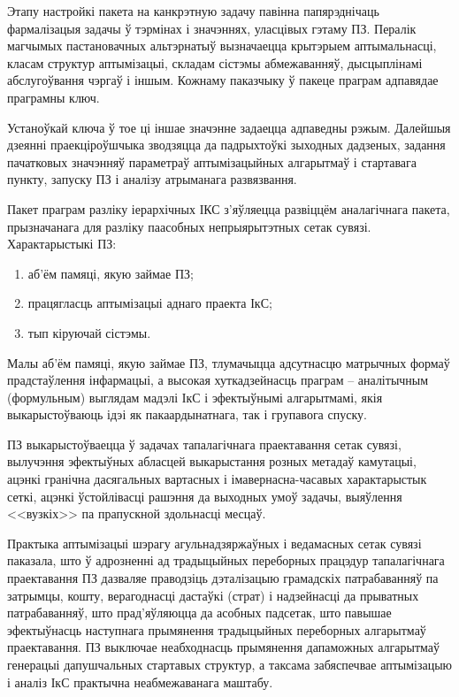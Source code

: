 Этапу настройкі пакета на канкрэтную задачу павінна папярэднічаць фармалізацыя задачы ў тэрмінах і значэннях, уласцівых гэтаму ПЗ. Пералік магчымых пастановачных альтэрнатыў вызначаецца крытэрыем аптымальнасці, класам структур аптымізацыі, складам сістэмы абмежаванняў, дысцыплінамі абслугоўвання чэргаў і іншым. Кожнаму паказчыку ў пакеце праграм адпавядае праграмны ключ.

Устаноўкай ключа ў тое ці іншае значэнне задаецца адпаведны рэжым.
Далейшыя дзеянні праекціроўшчыка зводзяцца да падрыхтоўкі зыходных дадзеных, задання пачатковых значэнняў параметраў аптымізацыйных алгарытмаў і стартавага пункту, запуску ПЗ і аналізу атрыманага развязвання.

Пакет праграм разліку іерархічных ІКС з'яўляецца развіццём аналагічнага пакета, прызначанага для разліку паасобных непрыярытэтных сетак сувязі. Характарыстыкі ПЗ:
\begin{enumerate}
    \item аб'ём памяці, якую займае ПЗ;
    \item працягласць аптымізацыі аднаго праекта ІкС;
    \item тып кіруючай сістэмы.
\end{enumerate}

Малы аб'ём памяці, якую займае ПЗ, тлумачыцца адсутнасцю матрычных формаў прадстаўлення інфармацыі, а высокая хуткадзейнасць праграм -- аналітычным (формульным) выглядам мадэлі ІкС і эфектыўнымі алгарытмамі, якія выкарыстоўваюць ідэі як пакаардынатнага, так і групавога спуску.

ПЗ выкарыстоўваецца ў задачах тапалагічнага праектавання сетак сувязі, вылучэння эфектыўных абласцей выкарыстання розных метадаў камутацыі, ацэнкі гранічна дасягальных вартасных і імавернасна-часавых характарыстык сеткі, ацэнкі ўстойлівасці рашэння да выходных умоў задачы, выяўлення <<вузкіх>> па прапускной здольнасці месцаў.

Практыка аптымізацыі шэрагу агульнадзяржаўных і ведамасных сетак сувязі паказала, што ў адрозненні ад традыцыйных переборных працэдур тапалагічнага праектавання ПЗ дазваляе праводзіць дэталізацыю грамадскіх патрабаванняў па затрымцы, кошту, верагоднасці дастаўкі (страт) і надзейнасці да прыватных патрабаванняў, што прад'яўляюцца да асобных падсетак, што павышае эфектыўнасць наступнага прымянення традыцыйных переборных алгарытмаў праектавання. ПЗ выключае неабходнасць прымянення дапаможных алгарытмаў генерацыі дапушчальных стартавых структур, а таксама забяспечвае аптымізацыю і аналіз ІкС практычна неабмежаванага маштабу.

